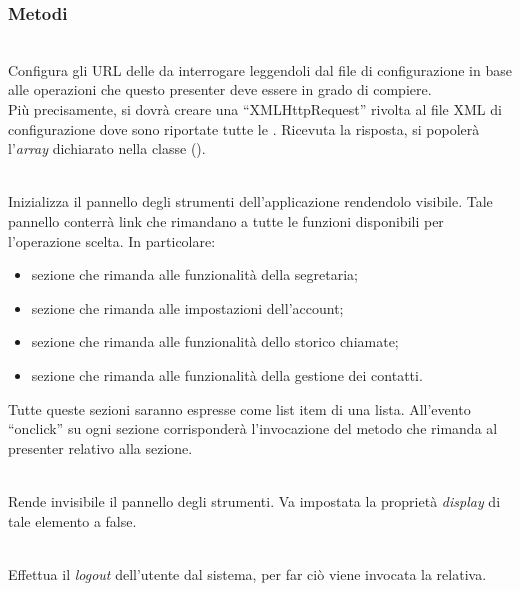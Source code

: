 \subsubsection*{Metodi}
\begin{description}
\item{}\\
Configura gli URL delle  da interrogare leggendoli dal file di configurazione in base alle operazioni che questo presenter deve essere in grado di compiere.\\
Più precisamente, si dovrà creare una ``XMLHttpRequest'' rivolta al file XML di configurazione dove sono riportate tutte le . Ricevuta la risposta, si popolerà l'\textit{array} dichiarato nella classe ().

\item{}\\
Inizializza il pannello degli strumenti dell'applicazione rendendolo visibile. Tale pannello conterrà link che rimandano a tutte le funzioni disponibili per l'operazione scelta. In particolare:
\begin{itemize}
\item sezione che rimanda alle funzionalità della segretaria;
\item sezione che rimanda alle impostazioni dell'account;
\item sezione che rimanda alle funzionalità dello storico chiamate;
\item sezione che rimanda alle funzionalità della gestione dei contatti.
\end{itemize}
Tutte queste sezioni saranno espresse come list item di una lista. All'evento ``onclick'' su ogni sezione corrisponderà l'invocazione del metodo che rimanda al presenter relativo alla sezione.

\item{}\\
Rende invisibile il pannello degli strumenti. Va impostata la proprietà \textit{display} di tale elemento a false.

\item{}\\
Effettua il \textit{logout} dell'utente dal sistema, per far ciò viene invocata la  relativa.

\end{description}


